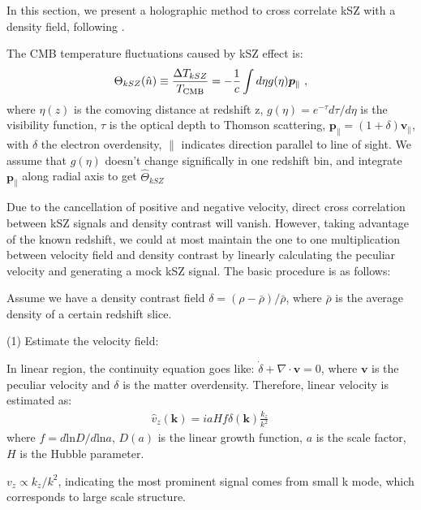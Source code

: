 In this section, we present a holographic method 
to cross correlate kSZ with a density field, 
following \cite{Shao11}. 

\label{sec:kszRecon}
The CMB temperature fluctuations caused by kSZ effect is:
\begin{eqnarray}
\label{eq:ksz}
\Theta_{kSZ}(\hat n)\equiv\frac{\Delta T_{kSZ}}{T_{\mathrm{CMB}}}
=-\frac{1}{c}\int d\eta  g(\eta)  \bm{p}_\parallel\ ,
\end{eqnarray}
where $\eta(z)$ is the comoving distance at redshift z, $g(\eta)=e^{-\tau} d\tau/d\eta$ is the visibility function, $\tau$ is the optical depth to Thomson scattering, $\bm{p}_\parallel=(1+\delta)\bm{v}_\parallel$, with $\delta$ the electron overdensity, $\parallel$ indicates direction parallel to line of sight. 
We assume that $g(\eta)$ doesn't change significally in one redshift bin, 
and integrate $\bm{p}_\parallel$ along radial axis to get $\hat \Theta_{kSZ}$

Due to the cancellation of positive and negative velocity, direct cross correlation between kSZ signals and density contrast will vanish.
However, taking advantage of the known redshift, 
we could at most maintain the one to one multiplication between velocity field and density contrast   
by linearly calculating the peculiar velocity 
and generating a mock kSZ signal. 
The basic procedure is as follows:

Assume we have a density contrast field $\delta=(\rho-\bar{\rho})/\bar{\rho}$, where $\bar\rho$ is the average density of a certain redshift slice. 

(1) Estimate the velocity field:

In linear region, the continuity equation goes like:
$\dot \delta+\nabla \cdot \bm{v}=0$, 
where $\bm{v}$ is the peculiar velocity and $\delta$ is the matter overdensity. 
Therefore, linear velocity is estimated as: 
\begin{eqnarray}
	\label{eq:v}
\hat v_z(\bm{k})=i a H f\delta(\bm{k})\frac{k_z}{k^2}\,
\end{eqnarray}
where $f=d\mathrm{ln}D/d\mathrm{ln}a$, $D(a)$ is the linear growth function, 
$a$ is the scale factor, $H$ is the Hubble parameter.

$v_z \propto k_z/k^2$, indicating the most prominent signal comes from small k mode, which corresponds to large scale structure. 

